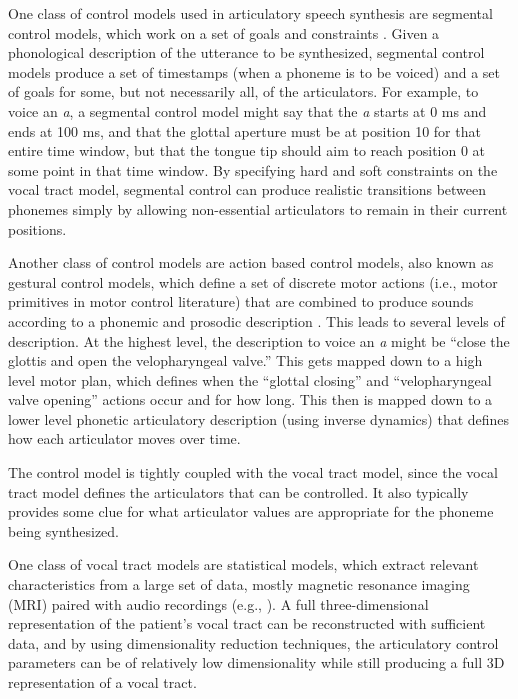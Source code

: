 \documentclass{article}
\begin{document}
One class of control models used in
articulatory speech synthesis
are segmental control models,
which work on a set of goals and constraints
\citep{kroger1992}.
Given a phonological description
of the utterance to be synthesized,
segmental control models
produce a set of timestamps
(when a phoneme is to be voiced)
and a set of goals for some,
but not necessarily all,
of the articulators.
For example, to voice an \textit{a},
a segmental control model might say
that the \textit{a} starts at 0 ms
and ends at 100 ms,
and that the glottal aperture
must be at position 10
for that entire time window,
but that the tongue tip
should aim to reach position 0
at some point in that time window.
By specifying hard and soft constraints
on the vocal tract model,
segmental control can produce
realistic transitions between
phonemes simply by allowing
non-essential articulators to
remain in their current positions.

Another class of control models are
action based control models,
also known as gestural control models,
which define a set of discrete motor actions
(i.e., motor primitives in motor control literature)
that are combined to produce sounds according
to a phonemic and prosodic description
\citep{birkholz2006}.
This leads to several levels of description.
At the highest level,
the description to voice an \textit{a}
might be
``close the glottis
and open the velopharyngeal valve.''
This gets mapped down to a
high level motor plan,
which defines when the ``glottal closing''
and ``velopharyngeal valve opening''
actions occur and for how long.
This then is mapped down
to a lower level phonetic articulatory description
(using inverse dynamics)
that defines how each articulator
moves over time.

The control model is tightly coupled
with the vocal tract model,
since the vocal tract model defines
the articulators that can be controlled.
It also typically provides some clue
for what articulator values
are appropriate for the
phoneme being synthesized.

One class of vocal tract models
are statistical models,
which extract relevant characteristics
from a large set of data,
mostly magnetic resonance imaging (MRI)
paired with audio recordings
(e.g., \citealp{badin2002}).
A full three-dimensional representation
of the patient's vocal tract
can be reconstructed with sufficient data,
and by using dimensionality reduction techniques,
the articulatory control parameters
can be of relatively low dimensionality
while still producing a full
3D representation of a vocal tract.
\end{document}
